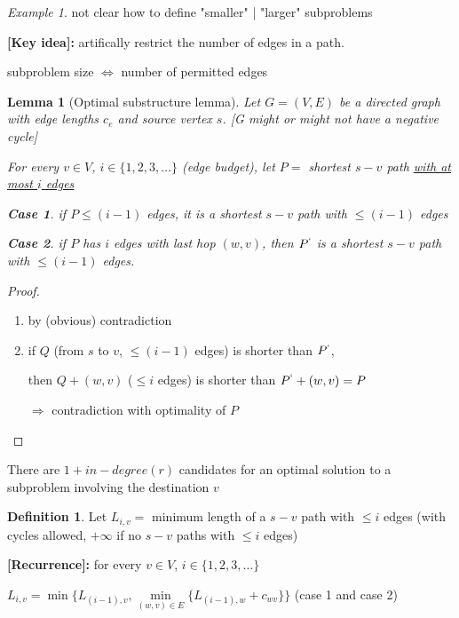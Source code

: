 \documentclass[a4paper,12pt]{article}
\theoremstyle{plain}
\newtheorem*{lemma}{Lemma}
\theoremstyle{definition}
\newtheorem*{definition}{Definition}
\newtheorem{case}{Case}[subsection]
\theoremstyle{remark}
\newtheorem*{example}{Example}
\begin{document}
\begin{example} not clear how to define "smaller" | "larger" subproblems\end{example}

\textbf{[Key idea]:} artifically restrict the number of edges in a path.

\begin{center}
subproblem size $\iff$ number of permitted edges
\end{center}

\begin{lemma}[Optimal substructure lemma]
Let $G = (V, E)$ be a directed graph with edge lengths $c_e$ and source vertex $s$. [G might or might not have a negative cycle]

For every $v \in V$, $i \in \{1, 2, 3, \dots\}$ (edge budget), let $P =$ shortest $s-v$ path \underline{with at most $i$ edges}
\begin{case}
if $P \leq (i-1)$ edges, it is a shortest $s-v$ path with $\leq (i-1)$ edges
\end{case}
\begin{case}
if $P$ has $i$ edges with last hop $(w, v)$, then $P^`$ is a shortest $s-v$ path with $\leq (i-1)$ edges.
\end{case}
\end{lemma}
\begin{proof}
\begin{enumerate}
	\item by (obvious) contradiction
	\item if $Q$ (from $s$ to $v$, $\leq (i-1)$ edges) is shorter than $P^`$,

	then $Q + (w, v)$ ($\leq i$ edges) is shorter than $P^` + (w, v) = P$

	$\Rightarrow$ contradiction with optimality of $P$
\end{enumerate}
\end{proof}

There are $1 + in-degree(r)$ candidates for an optimal solution to a subproblem involving the destination $v$
\\

\begin{definition} Let $L_{i,v} =$ minimum length of a $s-v$ path with $\leq i$ edges (with cycles allowed, $+\infty$ if no $s-v$ paths with $\leq i$ edges)\end{definition}

\textbf{[Recurrence]:} for every $v \in V$, $i \in \{1, 2, 3, \dots\}$
\begin{center}
$L_{i,v} = \min \{L_{(i-1),v}, \min\limits_{(w,v) \in E} \{L_{(i-1),w} + c_{wv}\}\}$ (case 1 and case 2)
\end{center}
\end{document}
